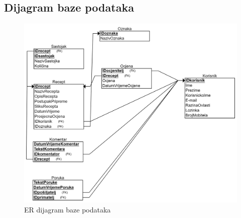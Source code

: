 			
			\subsection{Dijagram baze podataka}
			\begin{figure}[H]
				\includegraphics[scale=0.15]{slike/ER dijagram baze podataka.png} %
				\centering
				\caption{ER dijagram baze podataka}
				\label{fig:ER_diagram}
			\end{figure}
		
			\eject
			
			
